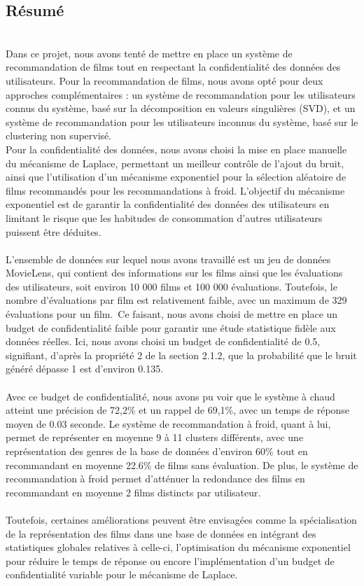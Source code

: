 \documentclass{article}
\begin{document}
\subsection{Résumé}
$ $\\
Dans ce projet, nous avons tenté de mettre en place un système de recommandation de films tout en respectant la confidentialité des données des utilisateurs.
Pour la recommandation de films, nous avons opté pour deux approches complémentaires : un système de recommandation pour les utilisateurs connus du système, 
basé sur la décomposition en valeurs singulières (SVD), et un système de recommandation pour les utilisateurs inconnus du système, basé sur le clustering non supervisé.\\
Pour la confidentialité des données, nous avons choisi la mise en place manuelle du mécanisme de Laplace, permettant un meilleur
contrôle de l'ajout du bruit, ainsi que l'utilisation d'un mécanisme exponentiel pour la sélection aléatoire de films recommandés pour les recommandations à froid.
L'objectif du mécanisme exponentiel est de garantir la confidentialité des données des utilisateurs en limitant le risque que les habitudes de consommation d'autres utilisateurs puissent être déduites.\\
\\
L'ensemble de données sur lequel nous avons travaillé est un jeu de données MovieLens, qui contient des informations sur les films ainsi que les évaluations des utilisateurs, soit environ 
10 000 films et 100 000 évaluations. Toutefois, le nombre d'évaluations par film est relativement faible, avec un maximum de 329 évaluations pour un film.\
Ce faisant, nous avons choisi de mettre en place un budget de confidentialité faible pour garantir une étude statistique fidèle aux données réelles. Ici, nous avons choisi un budget de confidentialité de 0.5, 
signifiant, d'après la propriété 2 de la section 2.1.2, que la probabilité que le bruit généré dépasse 1 est d'environ 0.135.\\
\\
Avec ce budget de confidentialité, nous avons pu voir que le système à chaud atteint une précision de 72,2\% et un rappel de 69,1\%, avec un temps de réponse moyen de 0.03 seconde.
Le système de recommandation à froid, quant à lui, permet de représenter en moyenne 9 à 11 clusters différents, avec une représentation des genres de la base de données d'environ 60\% tout 
en recommandant en moyenne 22.6\% de films sans évaluation. De plus, le système de recommandation à froid permet d’atténuer la redondance des films en recommandant en moyenne 2 films distincts par utilisateur.\\
\\
Toutefois, certaines améliorations peuvent être envisagées comme la spécialisation de la représentation des films dans une base de données en intégrant des statistiques globales relatives à celle-ci, 
l'optimisation du mécanisme exponentiel pour réduire le temps de réponse ou encore l'implémentation d'un budget de confidentialité variable pour le mécanisme de Laplace.\\
\end{document}
